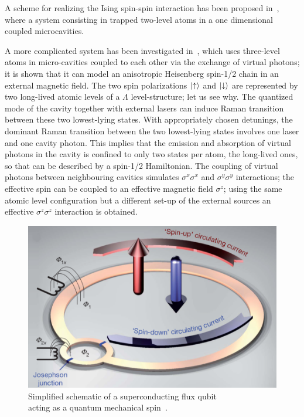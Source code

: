 A scheme for realizing the Ising spin-spin interaction has been proposed in~\cite{LiGuGong}, where a system consisting in trapped two-level atoms in a one dimensional coupled microcavities. 

A more complicated system has been investigated in~\cite{Hartmann_XYZ}, which uses three-level atoms in micro-cavities coupled to each other via the exchange of virtual photons; it is shown that it can model an anisotropic Heisenberg spin-1/2 chain in an external magnetic field. The two spin polarizations $\ket{\uparrow}$ and $\ket{\downarrow}$ are represented by two long-lived atomic levels of a $\Lambda$ level-structure; let us see why. The quantized mode of the cavity together with external lasers can induce Raman transition between these two lowest-lying states.  With appropriately chosen detunings, the dominant Raman transition between the two lowest-lying states involves one laser and one cavity photon. This implies that the emission and absorption of virtual photons in the cavity is confined to only two states per atom, the long-lived ones, so that can be described by a spin-1/2 Hamiltonian. The coupling of virtual photons between neighbouring cavities simulates $\sigma^x\sigma^x$ and $\sigma^y\sigma^y$ interactions; the effective spin can be coupled to an effective magnetic field $\sigma^z$; using the same atomic level configuration but a different set-up of the external sources an effective $\sigma^z\sigma^z$ interaction is obtained.

\begin{figure}[H]
    \centering
    \includegraphics[scale=0.5]{Figures/superconductinCircuit_SpinSystem.png}
    \caption{Simplified schematic of a superconducting flux qubit \\acting as a quantum mechanical spin~\cite{8spinChain_simulatedByQubits}.}
    \label{fig:superconductinCircuit_SpinSystem}
\end{figure}

